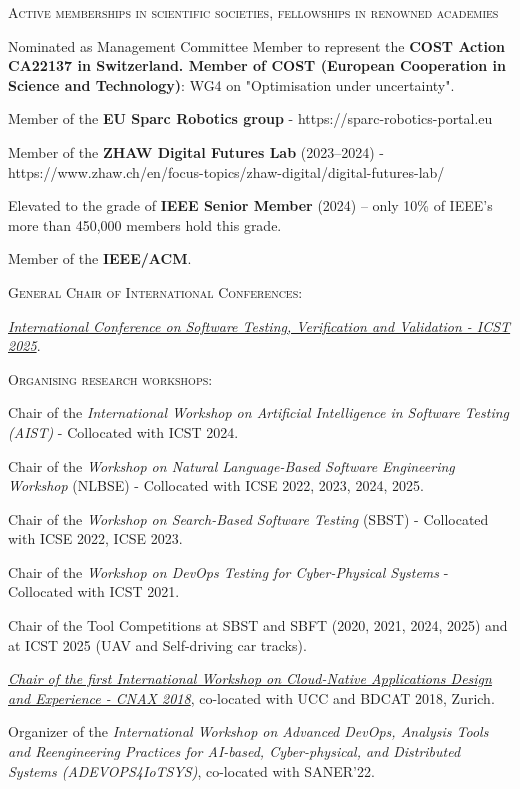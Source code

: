\documentclass[11pt]{article}
\begin{document}
\medskip 

\textsc{Active memberships in scientific societies, fellowships in renowned academies}

\begin{innerlist}
\item Nominated as Management Committee Member to represent the \textbf{COST Action CA22137 in Switzerland. Member of COST (European Cooperation in Science and Technology)}: WG4 on "Optimisation under uncertainty".
\item Member of the \textbf{EU Sparc Robotics group} - https://sparc-robotics-portal.eu
\item Member of the \textbf{ZHAW Digital Futures Lab} (2023–2024) - https://www.zhaw.ch/en/focus-topics/zhaw-digital/digital-futures-lab/
\item Elevated to the grade of \textbf{IEEE Senior Member} (2024) – only 10\% of IEEE’s more than 450,000 members hold this grade.
\item Member of the \textbf{IEEE/ACM}.
\end{innerlist}

\medskip\medskip 

\textsc{General Chair of International Conferences:}
\begin{innerlist}
 \item \href{https://conf.researchr.org/home/icst-2025}{\textit{International Conference on Software Testing, Verification and Validation - ICST 2025}}.
\end{innerlist}

\medskip\medskip 

\textsc{Organising research workshops:}
\begin{innerlist}
\item Chair of the \textit{International Workshop on Artificial Intelligence in Software Testing (AIST)} - Collocated with ICST 2024.
\item Chair of the \textit{Workshop on Natural Language-Based Software Engineering Workshop} (NLBSE) - Collocated with ICSE 2022, 2023, 2024, 2025.
\item Chair of the \textit{Workshop on Search-Based Software Testing} (SBST) - Collocated with ICSE 2022, ICSE 2023.
\item Chair of the \textit{Workshop on DevOps Testing for Cyber-Physical Systems} - Collocated with ICST 2021.
\item Chair of the Tool Competitions at SBST and SBFT (2020, 2021, 2024, 2025) and at ICST 2025 (UAV and Self-driving car tracks).
\item \emph{\href{http://cnax.servicelaboratory.ch/}{Chair of the first International Workshop on Cloud-Native Applications Design and Experience - CNAX 2018}}, co-located with UCC and BDCAT 2018, Zurich.
\item Organizer of the \textit{International Workshop on Advanced DevOps, Analysis Tools and Reengineering Practices for AI-based, Cyber-physical, and Distributed Systems (ADEVOPS4IoTSYS)}, co-located with SANER’22.
\end{innerlist}
\end{document}
